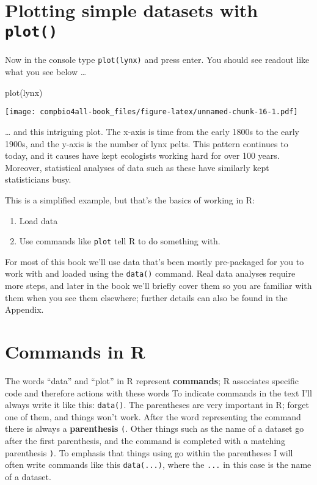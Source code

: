 \documentclass[
]{book}
\newenvironment{Shaded}{\begin{snugshade}}{\end{snugshade}}
\newcommand{\FunctionTok}[1]{\textcolor[rgb]{0.00,0.00,0.00}{#1}}
\newcommand{\NormalTok}[1]{#1}
\providecommand{\tightlist}{%
  \setlength{\itemsep}{0pt}\setlength{\parskip}{0pt}}
\begin{document}
\hypertarget{plotting-simple-datasets-with-plot}{%
\section{\texorpdfstring{Plotting simple datasets with \texttt{plot()}}{Plotting simple datasets with plot()}}\label{plotting-simple-datasets-with-plot}}

Now in the console type \texttt{plot(lynx)} and press enter. You should see readout like what you see below \ldots{}

\begin{Shaded}
\begin{Highlighting}[]
\FunctionTok{plot}\NormalTok{(lynx)}
\end{Highlighting}
\end{Shaded}

\texttt{[image: compbio4all-book\_files/figure-latex/unnamed-chunk-16-1.pdf]}

\ldots{} and this intriguing plot. The x-axis is time from the early 1800s to the early 1900s, and the y-axis is the number of lynx pelts. This pattern continues to today, and it causes have kept ecologists working hard for over 100 years. Moreover, statistical analyses of data such as these have similarly kept statisticians busy.

This is a simplified example, but that's the basics of working in R:

\begin{enumerate}
\def\labelenumi{\arabic{enumi}.}
\tightlist
\item
  Load data
\item
  Use commands like \texttt{plot} tell R to do something with.
\end{enumerate}

For most of this book we'll use data that's been mostly pre-packaged for you to work with and loaded using the \texttt{data()} command. Real data analyses require more steps, and later in the book we'll briefly cover them so you are familiar with them when you see them elsewhere; further details can also be found in the Appendix.

\hypertarget{commands-in-r}{%
\section{Commands in R}\label{commands-in-r}}

The words ``data'' and ``plot'' in R represent \textbf{commands}; R associates specific code and therefore actions with these words To indicate commands in the text I'll always write it like this: \texttt{data()}. The parentheses are very important in R; forget one of them, and things won't work. After the word representing the command there is always a \textbf{parenthesis} \texttt{(}. Other things such as the name of a dataset go after the first parenthesis, and the command is completed with a matching parenthesis \texttt{)}. To emphasis that things using go within the parentheses I will often write commands like this \texttt{data(...)}, where the \texttt{...} in this case is the name of a dataset.
\end{document}
